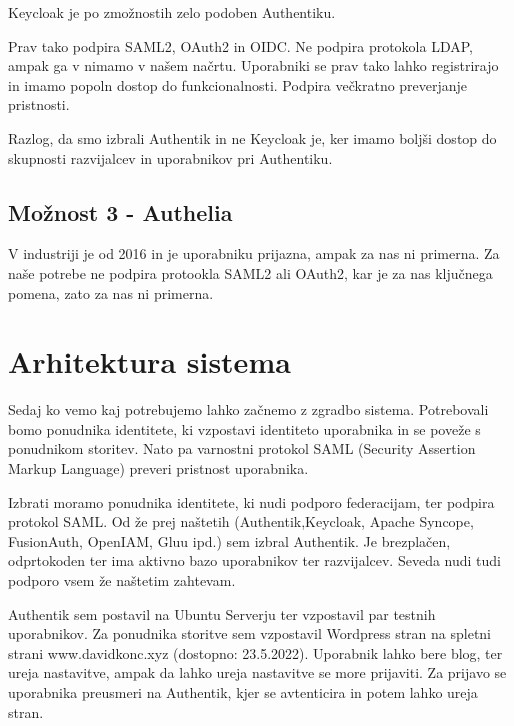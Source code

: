 \documentclass[a4paper,12pt,openright]{book}
\begin{document}
{Keycloak je po zmožnostih zelo podoben Authentiku. 

Prav tako podpira SAML2, OAuth2 in OIDC. Ne podpira protokola LDAP, ampak ga v nimamo v našem načrtu. 
\newline
Uporabniki se prav tako lahko registrirajo in imamo popoln dostop do funkcionalnosti. Podpira večkratno preverjanje pristnosti.

Razlog, da smo izbrali Authentik in ne Keycloak je, ker imamo boljši dostop do skupnosti razvijalcev in uporabnikov pri Authentiku.

\subsection{Možnost 3 - Authelia}

V industriji je od 2016 in je uporabniku prijazna, ampak za nas ni primerna. 
\newline
Za naše potrebe ne podpira protookla SAML2 ali OAuth2, kar je za nas ključnega pomena, zato za nas ni primerna. 

\section{Arhitektura sistema}

Sedaj ko vemo kaj potrebujemo lahko začnemo z zgradbo sistema. Potrebovali bomo ponudnika identitete, ki vzpostavi identiteto uporabnika in se poveže s ponudnikom storitev. Nato pa varnostni protokol SAML (Security Assertion Markup Language) preveri pristnost uporabnika. 

Izbrati moramo ponudnika identitete, ki nudi podporo federacijam, ter podpira protokol SAML. Od že prej naštetih (Authentik,Keycloak, Apache Syncope, FusionAuth, OpenIAM, Gluu ipd.) sem izbral Authentik. Je brezplačen, odprtokoden ter ima aktivno bazo uporabnikov ter razvijalcev. Seveda nudi tudi podporo vsem že naštetim zahtevam.  
\newline

Authentik sem postavil na Ubuntu Serverju ter vzpostavil par testnih uporabnikov. Za ponudnika storitve sem vzpostavil Wordpress stran na spletni strani www.davidkonc.xyz (dostopno: 23.5.2022). Uporabnik lahko bere blog, ter ureja nastavitve, ampak da lahko ureja nastavitve se more prijaviti. Za prijavo se uporabnika preusmeri na Authentik, kjer se avtenticira in potem lahko ureja stran. 

}
\end{document}
